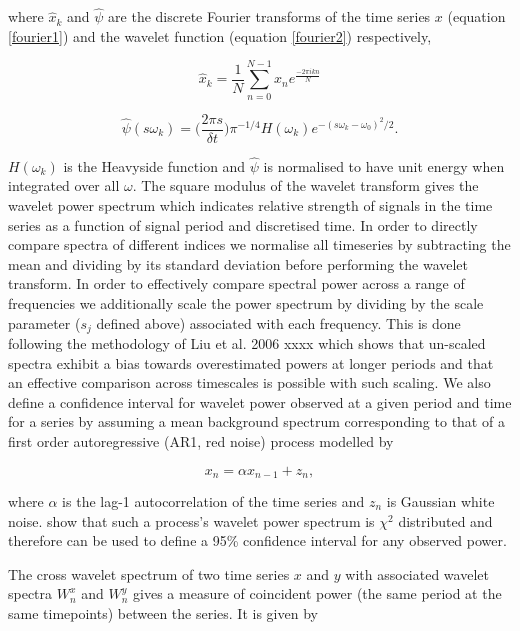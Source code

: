 where $\hat{x}_{k}$ and $\hat{\psi}$ are the discrete Fourier transforms of the time series $x$ (equation \ref{fourier1}) and the wavelet function (equation \ref{fourier2}) respectively,

\begin{equation} \label{fourier1}
\hat{x}_k = \frac{1}{N} \sum^{N-1}_{n = 0} x_n e^{\frac{-2\pi i k n}{N}}
\end{equation}

\begin{equation} \label{fourier2}
\hat{\psi}(s\omega_k) = \bigg(\frac{2 \pi s}{\delta t}\bigg) \pi^{-1/4}H(\omega_k) e^{-(s\omega_k - \omega_0)^2/2}.
\end{equation}

$H(\omega_k)$ is the Heavyside function and $\hat{\psi}$ is normalised to have unit energy when integrated over all $\omega$. The square modulus of the wavelet transform gives the wavelet power spectrum which indicates relative strength of signals in the time series as a function of signal period and discretised time. In order to directly compare spectra of different indices we normalise all timeseries by subtracting the mean and dividing by its standard deviation before performing the wavelet transform. In order to effectively compare spectral power across a range of frequencies we additionally scale the power spectrum by dividing by the scale parameter ($s_j$ defined above) associated with each frequency. This is done following the methodology of Liu et al. 2006 xxxx which shows that un-scaled spectra exhibit a bias towards overestimated powers at longer periods and that an effective comparison across timescales is possible with such scaling. We also define a confidence interval for wavelet power observed at a given period and time for a series by assuming a mean background spectrum corresponding to that of a first order autoregressive (AR1, red noise) process modelled by

\begin{equation} \label{rednoise}
x_n = \alpha x_{n - 1} + z_n,
\end{equation}

where $\alpha$ is the lag-1 autocorrelation of the time series and $z_n$ is Gaussian white noise. \cite{Torrence1998} show that such a process's wavelet power spectrum is $\chi^2$ distributed and therefore can be used to define a 95\% confidence interval for any observed power. 

The cross wavelet spectrum of two time series $x$ and $y$ with associated wavelet spectra $W^x_n$ and $W^y_n$ gives a measure of coincident power (the same period at the same timepoints) between the series. It is given by

